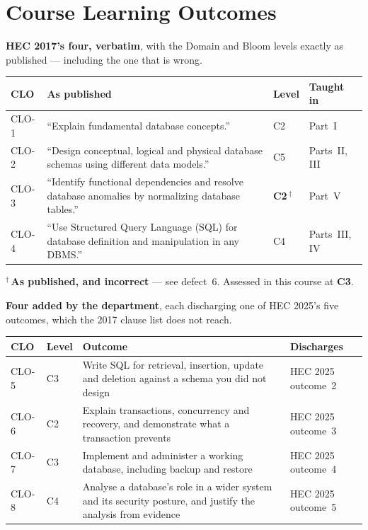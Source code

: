 \section*{Course Learning Outcomes}

\textbf{HEC 2017's four, verbatim}, with the Domain and Bloom levels exactly as
published --- including the one that is wrong.

\begin{longtable}{@{}L{1.4cm}L{9.6cm}L{1.6cm}L{2.0cm}@{}}
\toprule
{}
\textbf{CLO} & \textbf{As published} & \textbf{Level} & \textbf{Taught in} \\
\midrule
\endhead
CLO-1 & ``Explain fundamental database concepts.'' & C2 & Part~I \\
CLO-2 & ``Design conceptual, logical and physical database schemas using
different data models.'' & C5 & Parts~II, III \\
CLO-3 & ``Identify functional dependencies and resolve database anomalies by
normalizing database tables.'' & \textbf{C2}\,$^\dagger$ & Part~V \\
CLO-4 & ``Use Structured Query Language (SQL) for database definition and
manipulation in any DBMS.'' & C4 & Parts~III, IV \\
\bottomrule
\end{longtable}

\noindent$^\dagger$\,\textbf{As published, and incorrect} --- see defect~6.
Assessed in this course at \textbf{C3}.

\medskip
\noindent\textbf{Four added by the department}, each discharging one of HEC
2025's five outcomes, which the 2017 clause list does not reach.

\begin{longtable}{@{}L{1.4cm}L{1.3cm}L{8.3cm}L{3.6cm}@{}}
\toprule
{}
\textbf{CLO} & \textbf{Level} & \textbf{Outcome} & \textbf{Discharges} \\
\midrule
\endhead
CLO-5 & C3 & Write SQL for retrieval, insertion, update and deletion against a
schema you did not design & HEC 2025 outcome~2 \\
CLO-6 & C2 & Explain transactions, concurrency and recovery, and demonstrate
what a transaction prevents & HEC 2025 outcome~3 \\
CLO-7 & C3 & Implement and administer a working database, including backup and
restore & HEC 2025 outcome~4 \\
CLO-8 & C4 & Analyse a database's role in a wider system and its security
posture, and justify the analysis from evidence & HEC 2025 outcome~5 \\
\bottomrule
\end{longtable}

